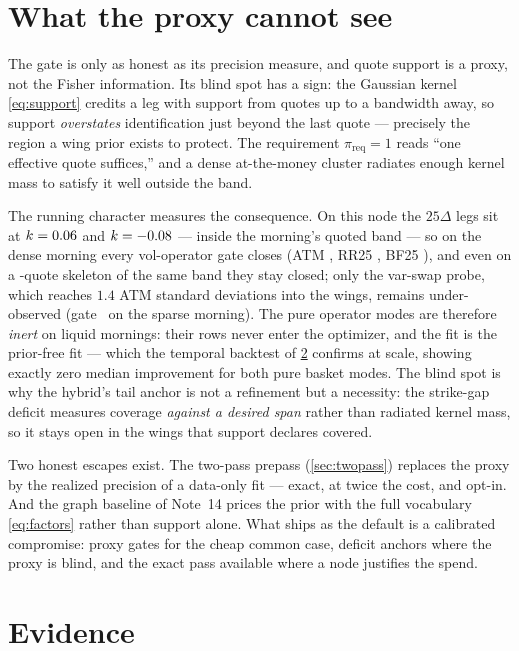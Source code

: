 \documentclass[11pt]{article}
\begin{document}
\section{What the proxy cannot see}
\label{sec:blind}

The gate is only as honest as its precision measure, and quote support
is a proxy, not the Fisher information.  Its blind spot has a sign:
the Gaussian kernel \eqref{eq:support} credits a leg with support from
quotes up to a bandwidth away, so support \emph{overstates}
identification just beyond the last quote --- precisely the region a
wing prior exists to protect.  The requirement $\pi_{\mathrm{req}}=1$
reads ``one effective quote suffices,'' and a dense at-the-money
cluster radiates enough kernel mass to satisfy it well outside the
band.

The running character measures the consequence.  On this node the
$25\Delta$ legs sit at $k=0.06$ and
$k=-0.08$ --- inside the morning's quoted band --- so on
the dense morning every vol-operator gate closes (ATM
\pflgapdenseatm, RR25 \pflgapdenserr, BF25 \pflgapdensebf), and even
on a \pflnsparse-quote skeleton of the same band they stay closed;
only the var-swap probe, which reaches $1.4$ ATM standard deviations
into the wings, remains under-observed (gate \pflgapsparsevs\ on the
sparse morning).  The pure operator modes are therefore \emph{inert}
on liquid mornings: their rows never enter the optimizer, and the fit
is the prior-free fit --- which the temporal backtest of
\cref{sec:evidence} confirms at scale, showing exactly zero median
improvement for both pure basket modes.  The blind spot is why the
hybrid's tail anchor is not a refinement but a necessity: the
strike-gap deficit measures coverage \emph{against a desired span}
rather than radiated kernel mass, so it stays open in the wings that
support declares covered.

Two honest escapes exist.  The two-pass prepass
(\cref{sec:twopass}) replaces the proxy by the realized precision of
a data-only fit --- exact, at twice the cost, and opt-in.  And the
graph baseline of Note~14 prices the prior with the full vocabulary
\eqref{eq:factors} rather than support alone.  What ships as the
default is a calibrated compromise: proxy gates for the cheap common
case, deficit anchors where the proxy is blind, and the exact pass
available where a node justifies the spend.

\section{Evidence}
\label{sec:evidence}
\end{document}
